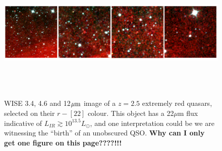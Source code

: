 \documentclass[12pt]{article}
\begin{document}
\clearpage

%
%
\rationaletime          %



\clearpage

%
%
\justification          %




\setlength {\textwidth}{180mm} 
\begin{figure}[h]
  \begin{center}
    \hspace{-0.5cm}
    \includegraphics[height=6.0cm,width=17.8cm]{../Figures/ERQs_4inarow_crop.png}
    \vspace{-10pt}
    \caption{
      \footnotesize
      WISE 3.4, 4.6 and 12$\mu {\rm m}$ image of a $z=2.5$ 
      extremely red quasars, selected on their $r-[22]$ colour. This object
      has a 22$\mu$m flux indicative of $L_{IR} \gtrsim 10^{13.5} L_{\odot}$, 
      and one interpretation could be we are witnessing the
      ``birth'' of an unobscured QSO.  
 {\bf Why can I only get one figure on this page????!!!}
}
    \vspace{-14pt}
    \label{figtest-fig}
  \end{center}
\end{figure}
\end{document}
